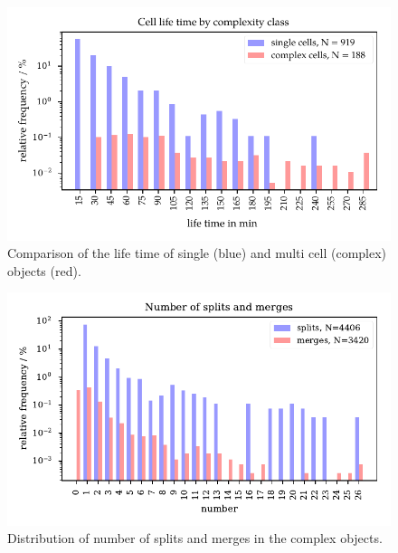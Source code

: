 \begin{figure}[htbp]
\centering
\includegraphics[width=\textwidth]{Grafiken/Abbildungen/cellclass_lifetime.pdf}
\caption{Comparison of the life time of single (blue) and multi cell (complex) objects (red).}
\label{fig:cell_ltime}
\end{figure}

\begin{figure}[htbp]
\centering
\includegraphics[width=\textwidth]{Grafiken/Abbildungen/splits_merges.pdf}
\caption{Distribution of number of splits and merges in the complex objects.}
\label{fig:splits_merges}
\end{figure}

